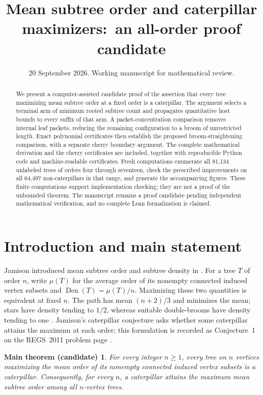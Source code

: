\documentclass[11pt,reqno]{amsart}
\title[Mean subtree order and caterpillar maximizers]{Mean subtree order and caterpillar maximizers:\ an all-order proof candidate}
\date{20 September 2026. Working manuscript for mathematical review.}
\theoremstyle{plain}
\newtheorem*{maintheorem}{Main theorem (candidate)}
\begin{document}
\begin{abstract}
We present a computer-assisted candidate proof of the assertion that every tree maximizing mean subtree order at a fixed order is a caterpillar. The argument selects a terminal arm of minimum rooted subtree count and propagates quantitative host bounds to every suffix of that arm. A packet-concentration comparison removes internal leaf packets, reducing the remaining configuration to a broom of unrestricted length. Exact polynomial certificates then establish the proposed broom-straightening comparison, with a separate cherry boundary argument. The complete mathematical derivation and the cherry certificates are included, together with reproducible Python code and machine-readable certificates. Fresh computations enumerate all 81,134 unlabeled trees of orders four through seventeen, check the prescribed improvements on all 64,497 non-caterpillars in that range, and generate the accompanying figures. These finite computations support implementation checking; they are not a proof of the unbounded theorem. The manuscript remains a proof candidate pending independent mathematical verification, and no complete Lean formalization is claimed.
\end{abstract}
\maketitle

\section*{Introduction and main statement}
Jamison introduced mean subtree order and subtree density in
\cite{Jamison1983,Jamison1984}. For a tree $T$ of order $n$, write
$\mu(T)$ for the average order of its nonempty connected induced vertex subsets
and $\operatorname{Den}(T)=\mu(T)/n$. Maximizing these two quantities is equivalent
at fixed $n$. The path has mean $(n+2)/3$ and minimizes the mean; stars have density
tending to $1/2$, whereas suitable double-brooms have density tending to one
\cite{Jamison1983}. Jamison's caterpillar conjecture asks whether some caterpillar
attains the maximum at each order; this formulation is recorded as Conjecture~1
on the REGS~2011 problem page \cite{JamisonREGS2011}.

\begin{maintheorem}\label{thm:main}
For every integer $n\ge1$, every tree on $n$ vertices maximizing the mean order
of its nonempty connected induced vertex subsets is a caterpillar.
Consequently, for every $n$, a caterpillar attains the maximum mean subtree
order among all $n$-vertex trees.
\end{maintheorem}
\end{document}
